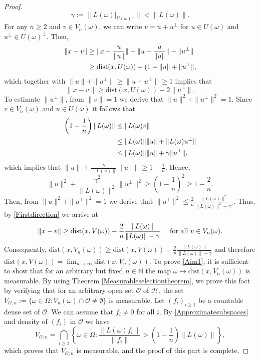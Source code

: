\documentclass[pdflatex,sn-mathphys-num]{sn-jnl}%
\theoremstyle{thmstyleone}%
\theoremstyle{thmstyletwo}%
\theoremstyle{thmstylethree}%
\newcommand{\N}{\mathbb{N}}
\newcommand{\cH}{\mathcal{H}}
\newcommand{\cO}{\mathcal{O}}
\numberwithin{equation}{section}
\begin{document}
\begin{proof}
\begin{equation}\label{Gamma_Constant}
\gamma:=\|L(\omega)|_{U(\omega)^{\perp}}\|<\|L(\omega)\|.
\end{equation}
For any $n\geq 2$ and $v\in V_n(\omega)$, we can write $v=u+u^{\perp}$ for $u\in U(\omega)$ and $u^{\perp}\in U(\omega)^{\perp}$. Then,
\begin{align}
\|x-v\|
& \geq \|x-\frac{u}{\|u\|}\|-\|u-\frac{u}{\|u\|}\| -\|u^{\perp}\|
\notag\\
& \geq \mbox{dist}(x,U(\omega))-(1-\|u\|+\|u^{\perp}\|,\notag
\end{align}
which together with $\|u\|+\|u^{\perp}\|\geq \|u+u^{\perp}\|\geq 1$ implies that 
\begin{equation}\label{Firstdirection}
 \|x-v\|
 \geq 
 \mbox{dist}(x,U(\omega))-2\|u^{\perp}\|.
\end{equation}
To estimate $\|u^{\perp}\|$, from $\|v\|=1$ we derive that $\|u\|^2+ \|u^{\perp}\|^2=1$. Since $v\in V_n(\omega)$ and $u\in U(\omega)$ it follows that 
\begin{align}
\left(1-\frac{1}{n}\right)\|L(\omega)\| 
& \leq 
\|L(\omega)v\|\notag\\
& \leq \|L(\omega)\| \|u\| +\|L(\omega) u^{\perp}\|\notag\\
&\leq 
\|L(\omega)\| \|u\| +\gamma \|u^{\perp}\|,\notag
\end{align}
which implies that $\|u\|+\frac{\gamma}{\|L(\omega)\|}\|u^{\perp}\|\geq 1-\frac{1}{n}$. Hence,
\[
\|u\|^2+ \frac{\gamma^2}{\|L(\omega)\|^2}\|u^{\perp}\|^2\geq \left(1-\frac{1}{n}\right)^2\geq 1-\frac{2}{n}.
\]
Then, from $\|u\|^2+ \|u^{\perp}\|^2=1$ we derive that  $\|u^{\perp}\|^2\leq \frac{2}{n}\frac{\|L(\omega)\|^2}{\|L(\omega)\|^2-\gamma^2}$. Thus, by \eqref{Firstdirection} we arrive at 
\[
\|x-v\|\geq \mbox{dist}(x,V(\omega))
-\frac{2}{n}\frac{\|L(\omega)\|}{\|L(\omega)\|-\gamma}
\quad \hbox{ for all } v\in V_n(\omega).
\]
Consequently, $\mbox{dist}(x,V_n(\omega))\geq \mbox{dist}(x,V(\omega))
-\frac{2}{n}\frac{\|L(\omega)\|}{\|L(\omega)\|-\gamma}$ and therefore  $\mbox{dist}(x,V(\omega))=\lim_{n\to\infty}\mbox{dist}(x,V_n(\omega))$. To prove \eqref{Aim1}, it is sufficient to show that for an arbitrary but fixed $n\in\N$ the map $\omega\mapsto \mbox{dist}(x,V_n(\omega))$ is measurable. By using Theorem \ref{Measurableselectiontheorem}, we prove this fact by verifying that for an arbitrary open set 
$\cO$ of $\cH$, the set $V_{\cO;n}:=\{\omega\in\Omega: V_n(\omega)\cap \cO\not=\emptyset\}$ is measurable. Let $(f_i)_{i\geq 1}$ be a countable dense set of $\cO$. We can assume that $f_i\not=0$ for all $i$. By \eqref{Approximatesubspaces} and density of $(f_i) $ in $\mathcal O$ we have 
\begin{equation*}
V_{\cO;n}=\bigcap_{i\geq 1}\left\{
\omega\in\Omega: \frac{\|L(\omega)f_i\|}{\|f_i\|}>\left(1-\frac{1}{n}\right)\|L(\omega)\|
\right\},
\end{equation*}
which proves that $V_{\cO;n}$ is measurable, and the proof of this part is complete.


\end{proof}
\end{document}
